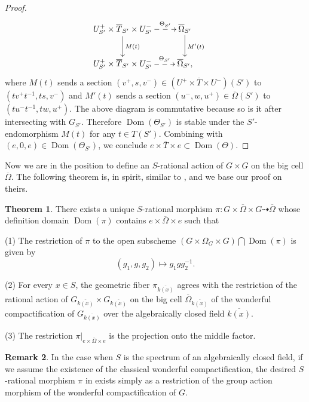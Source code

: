 \documentclass[11pt, reqno]{amsart}
\theoremstyle{plain}
\theoremstyle{definition}
\newtheorem{theorem}{Theorem}[section]
\newtheorem{remark}[theorem]{Remark}
\DeclareMathOperator{\Dom}{Dom} %
\begin{document}
\begin{proof}
\begin{equation}\label{diagramtheta}
\begin{gathered}
    \xymatrix{
U^+_{S'}\times \overline{T}_{S'}\times U^-_{S'}\ar@{-->}[r]^-{\Theta_{S'}}\ar[d]^{M(t)} & \overline{\Omega}_{S'}\ar[d]^{M'(t)} &\\
U^+_{S'}\times \overline{T}_{S'}\times U^-_{S'}\ar@{-->}[r]^-{\Theta_{S'}} &  \overline{\Omega}_{S'}, & }
\end{gathered}
\end{equation}
where $M(t)$ sends a section $(v^+, s, v^-)\in (U^+\times \overline{T}\times U^-)(S')$ to $(tv^+t^{-1},ts, v^-)$ and $M'(t)$ sends a section $(u^-, w, u^+)\in\overline{\Omega}(S')$ to $(tu^-t^{-1}, tw, u^+)$. The above diagram is commutative because so is it after intersecting with $G_{S'}$. Therefore $\Dom(\Theta_{S'})$ is stable under the $S'$-endomorphism $M(t)$ for any $t\in T(S')$. Combining with $(e,0,e)\in \Dom(\Theta_{S'})$, we conclude $e\times \overline{T}\times e\subset \Dom(\Theta)$. 
\end{proof}

Now we are in the position to define an $S$-rational action of $G\times G$ on the big cell $\overline{\Omega}$.
The following theorem is, in spirit, similar to \cite[exposé~XXV, proposition~2.9]{SGA3III}, and we base our proof on theirs.

\begin{theorem}\label{theoremrationalaction}
    There exists a unique $S$-rational morphism $\pi\colon G\times\overline{\Omega}\times G\dashrightarrow \overline{\Omega}$ whose definition domain $\Dom(\pi)$ contains $e\times\overline{\Omega}\times e$ 
    such that 

    (1) The restriction of $\pi$ to the open subscheme $(G\times\Omega_G\times G)\bigcap\Dom(\pi)$ is given by 
$$(g_1,g,g_2)\longmapsto g_1gg_2^{-1}.$$
        
    (2) For every $x\in S$, the geometric fiber $\pi_{\overline{k(x)}}$ agrees with the restriction of the rational action of $G_{\overline{k(x)}}\times G_{\overline{k(x)}}$ on the big cell $\overline{\Omega}_{\overline{k(x)}}$ of the wonderful compactification of $G_{\overline{k(x)}}$ over the algebraically closed field $\overline{k(x)}$.

    (3) The restriction $\pi\vert_{e\times\overline{\Omega}\times e}$ is the projection onto the middle factor. 
\end{theorem}

\begin{remark}
    In the case when $S$ is the spectrum of an algebraically closed field, if we assume the existence of the classical wonderful compactification, the desired $S$-rational morphism $\pi$ in  exists simply as a restriction of the group action morphism of the wonderful compactification of $G$.  
\end{remark}
\end{document}
